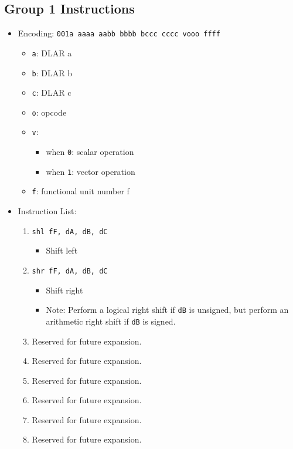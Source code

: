 \documentclass{article}
\begin{document}
	\subsection{Group 1 Instructions}
		\begin{itemize}
		\item Encoding:  \texttt{001a aaaa aabb bbbb  bccc cccc vooo ffff}
			\begin{itemize}
			\item \texttt{a}:  DLAR a
			\item \texttt{b}:  DLAR b
			\item \texttt{c}:  DLAR c
			\item \texttt{o}:  opcode
			\item \texttt{v}:
				\begin{itemize}
				\item when \texttt{0}:  scalar operation
				\item when \texttt{1}:  vector operation
				\end{itemize}
			\item \texttt{f}:  functional unit number f
			\end{itemize}
		\item Instruction List:
			\begin{enumerate}
			\item \texttt{shl fF, dA, dB, dC}
				\begin{itemize}
				\item Shift left
				\end{itemize}
			\item \texttt{shr fF, dA, dB, dC}
				\begin{itemize}
				\item Shift right
				\item Note:  Perform a logical right shift if \texttt{dB}
					is unsigned, but perform an arithmetic right shift if
					\texttt{dB} is signed.
				\end{itemize}
			\item Reserved for future expansion.
			\item Reserved for future expansion.

			\item Reserved for future expansion.
			\item Reserved for future expansion.
			\item Reserved for future expansion.
			\item Reserved for future expansion.
			\end{enumerate}
		\end{itemize}
\end{document}
